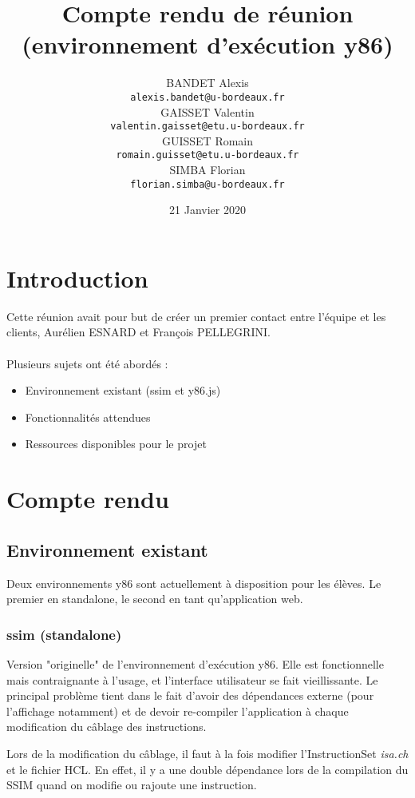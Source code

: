 \documentclass[french]{article}
\title{Compte rendu de réunion (environnement d'exécution y86)}
\author{
    BANDET Alexis \\
    \texttt{alexis.bandet@u-bordeaux.fr} \\
    GAISSET Valentin \\
    \texttt{valentin.gaisset@etu.u-bordeaux.fr} \\
    GUISSET Romain \\
    \texttt{romain.guisset@etu.u-bordeaux.fr} \\
    SIMBA Florian \\
    \texttt{florian.simba@u-bordeaux.fr} \\
}
\date{21 Janvier 2020}
\begin{document}
\maketitle
\newpage
\tableofcontents
\newpage

\section{Introduction}

Cette réunion avait pour but de créer un premier contact entre l'équipe et les clients, Aurélien ESNARD et François PELLEGRINI.\\
\\
Plusieurs sujets ont été abordés : \\

\begin{itemize}
    \item Environnement existant (ssim et y86.js)
    \item Fonctionnalités attendues
    \item Ressources disponibles pour le projet
\end{itemize}

\section{Compte rendu}

\subsection{Environnement existant}

Deux environnements y86 sont actuellement à disposition pour les élèves. Le premier en standalone, le second en tant qu'application web.

\subsubsection{ssim (standalone)}

Version "originelle" de l'environnement d'exécution y86. Elle est fonctionnelle mais contraignante à l'usage, et l'interface utilisateur se fait vieillissante. Le principal problème tient dans le fait d'avoir des dépendances externe (pour l'affichage notamment) et de devoir re-compiler l'application à chaque modification du câblage des instructions.

Lors de la modification du câblage, il faut à la fois modifier l'InstructionSet \textit{isa.ch} et le fichier HCL. En effet, il y a une double dépendance lors de la compilation du SSIM quand on modifie ou rajoute une instruction.
\end{document}
